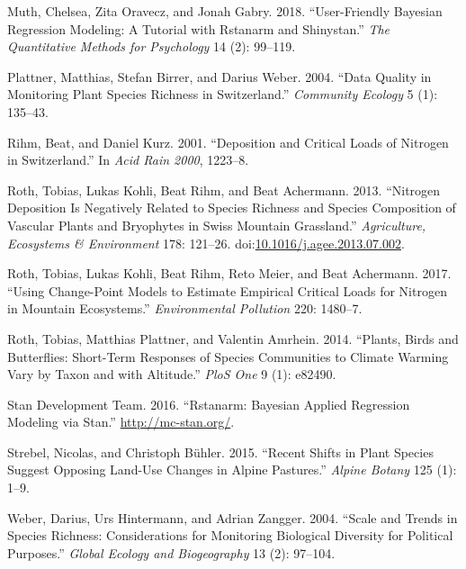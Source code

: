 \documentclass[fleqn,10pt,lineno]{wlpeerj} %
\theoremstyle{definition}
\theoremstyle{definition}
\theoremstyle{definition}
\theoremstyle{remark}
\begin{document}
\hypertarget{ref-Muth2018}{}
Muth, Chelsea, Zita Oravecz, and Jonah Gabry. 2018. ``User-Friendly
Bayesian Regression Modeling: A Tutorial with Rstanarm and Shinystan.''
\emph{The Quantitative Methods for Psychology} 14 (2): 99--119.

\hypertarget{ref-Plattner2004}{}
Plattner, Matthias, Stefan Birrer, and Darius Weber. 2004. ``Data
Quality in Monitoring Plant Species Richness in Switzerland.''
\emph{Community Ecology} 5 (1): 135--43.

\hypertarget{ref-Rihm2001}{}
Rihm, Beat, and Daniel Kurz. 2001. ``Deposition and Critical Loads of
Nitrogen in Switzerland.'' In \emph{Acid Rain 2000}, 1223--8.

\hypertarget{ref-Roth2013}{}
Roth, Tobias, Lukas Kohli, Beat Rihm, and Beat Achermann. 2013.
``Nitrogen Deposition Is Negatively Related to Species Richness and
Species Composition of Vascular Plants and Bryophytes in Swiss Mountain
Grassland.'' \emph{Agriculture, Ecosystems \& Environment} 178: 121--26.
doi:\href{https://doi.org/10.1016/j.agee.2013.07.002}{10.1016/j.agee.2013.07.002}.

\hypertarget{ref-Roth2017}{}
Roth, Tobias, Lukas Kohli, Beat Rihm, Reto Meier, and Beat Achermann.
2017. ``Using Change-Point Models to Estimate Empirical Critical Loads
for Nitrogen in Mountain Ecosystems.'' \emph{Environmental Pollution}
220: 1480--7.

\hypertarget{ref-Roth2014}{}
Roth, Tobias, Matthias Plattner, and Valentin Amrhein. 2014. ``Plants,
Birds and Butterflies: Short-Term Responses of Species Communities to
Climate Warming Vary by Taxon and with Altitude.'' \emph{PloS One} 9
(1): e82490.

\hypertarget{ref-Stan2016}{}
Stan Development Team. 2016. ``Rstanarm: Bayesian Applied Regression
Modeling via Stan.'' \url{http://mc-stan.org/}.

\hypertarget{ref-Strebel2015}{}
Strebel, Nicolas, and Christoph Bühler. 2015. ``Recent Shifts in Plant
Species Suggest Opposing Land-Use Changes in Alpine Pastures.''
\emph{Alpine Botany} 125 (1): 1--9.

\hypertarget{ref-Weber2004}{}
Weber, Darius, Urs Hintermann, and Adrian Zangger. 2004. ``Scale and
Trends in Species Richness: Considerations for Monitoring Biological
Diversity for Political Purposes.'' \emph{Global Ecology and
Biogeography} 13 (2): 97--104.
\end{document}
